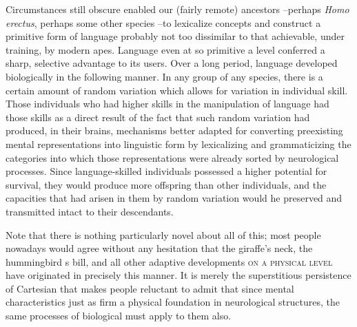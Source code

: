 Circumstances still obscure enabled our (fairly remote) ancestors --perhaps \textit{Homo erectus}, perhaps some other species --to lexicalize concepts and construct a primitive form of language probably not too dissimilar to that achievable, under training, by modern apes. Language even at so primitive a level conferred a sharp, selective advantage to its users. Over a long period, language developed biologically in the following manner. In any group of any species, there is a certain amount of random variation which allows for variation in individual skill. Those individuals who had higher skills in the manipulation of language had those skills as a direct result of the fact that such random variation had produced, in their brains, mechanisms better adapted for converting preexisting mental representations into linguistic form by lexicalizing and grammaticizing the categories into which those representations were already sorted by neurological processes. Since language-skilled individuals possessed a higher potential for survival, they would produce more offspring than other individuals, and the capacities that had arisen in them by random variation would he preserved and transmitted intact to their descendants.

Note that there is nothing particularly novel about all of this; most people nowadays would agree without any hesitation that the giraffe's neck, the hummingbird s bill, and all other adaptive developments \textsc{on a physical level} have originated in precisely this manner. It is merely the superstitious persistence of Cartesian  that makes people reluctant to admit that since mental characteristics just as firm a physical foundation in neurological structures, the same processes of biological  must apply to them also.

